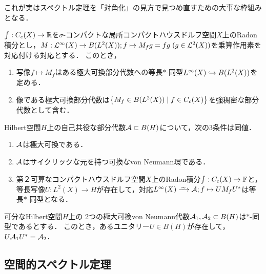 \documentclass[uplatex,dvipdfmx]{jsreport}
\begin{document}
\begin{tcolorbox}[colframe=ForestGreen, colback=ForestGreen!10!white,breakable,colbacktitle=ForestGreen!40!white,coltitle=black,fonttitle=\bfseries\sffamily,
title=]
    これが実はスペクトル定理を「対角化」の見方で見つめ直すための大事な枠組みとなる．
\end{tcolorbox}

\begin{proposition}
    $\int:C_c(X)\to\mathbb{R}$を$\sigma$-コンパクトな局所コンパクトハウスドルフ空間$X$上のRadon積分とし，$M:\mathcal{L}^\infty(X)\to B(L^2(X));f\mapsto M_fg=fg\;(g\in\mathcal{L}^2(X))$を乗算作用素を対応付ける対応とする．
    このとき，
    \begin{enumerate}
        \item 写像$f\mapsto M_f$はある極大可換部分代数への等長$*$-同型$L^\infty(X)\hookrightarrow B(L^2(X))$を定める．
        \item 像である極大可換部分代数は$\left\{M_f\in B(L^2(X))\mid f\in C_c(X)\right\}$を強稠密な部分代数として含む．
    \end{enumerate}
\end{proposition}

\begin{theorem}
    Hilbert空間$H$上の自己共役な部分代数$\mathcal{A}\subset B(H)$について，次の3条件は同値．
    \begin{enumerate}
        \item $\mathcal{A}$は極大可換である．
        \item $\mathcal{A}$はサイクリックな元を持つ可換なvon Neumann環である．
        \item 第２可算なコンパクトハウスドルフ空間$X$上のRadon積分$\int:C_c(X)\to\mathbb{F}$と，等長写像$U:L^2(X)\to H$が存在して，対応$L^\infty(X)\iso\A;f\mapsto UM_fU^*$は等長$*$-同型となる．
    \end{enumerate}
\end{theorem}

\begin{proposition}
    可分なHilbert空間$H$上の
    2つの極大可換von Neumann代数$\mathcal{A}_1,\mathcal{A}_2\subset B(H)$は$*$-同型であるとする．
    このとき，あるユニタリー$U\in B(H)$が存在して，$U\mathcal{A}_1U^*=\mathcal{A}_2$．
\end{proposition}

\subsection{空間的スペクトル定理}
\end{document}
